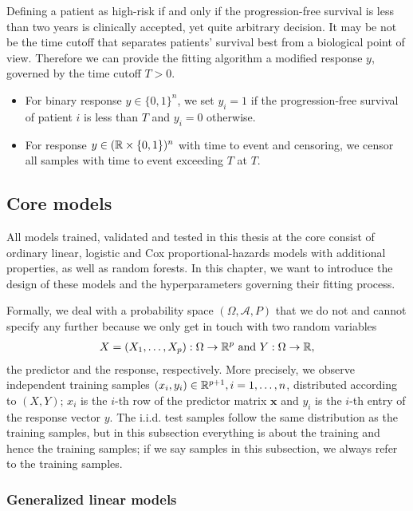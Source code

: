 Defining a patient as high-risk if and only if the progression-free survival is less than two years
is clinically accepted, yet quite arbitrary decision. It may be not be the time cutoff that 
separates patients' survival 
best from a biological point of view. Therefore we can provide the fitting 
algorithm a modified response $y$, governed by the time cutoff $T > 0$.
\begin{itemize}
    \item For binary response $y \in \{0, 1\}^n$, we set $y_i = 1$ if the progression-free survival 
        of patient $i$ is less than $T$ and $y_i = 0$ otherwise.
    \item For response $y \in (\mathbb{R} \times \{0, 1\})^n$ with time to event and censoring, we censor 
        all samples with time to event exceeding $T$ at $T$.
\end{itemize}

\subsection{Core models}\label{subsec:core-models}

All models trained, validated and tested in this thesis at the core consist of ordinary linear, 
logistic and Cox proportional-hazards models with additional properties, as well as random forests.
In this chapter, we want to introduce the design of these models and the hyperparameters governing 
their fitting process.

Formally, we deal with a probability space $(\Omega, \mathcal{A}, P)$ that we do not and cannot 
specify any further because we only get in touch with two random variables 
\begin{align}
    X = (X_1, \ldots, X_p): \Omega \to \mathbb{R}^p \text{ and } Y: \Omega \to \mathbb{R},
\end{align}
the predictor and the response, respectively. More 
precisely, we observe independent training samples $(x_i, y_i) \in \mathbb{R}^{p+1}, i = 1, \ldots, n$, 
distributed according to $(X, Y)$; $x_i$ is the $i$-th row of the predictor matrix $\mathbf{x}$ and
$y_i$ is the $i$-th entry of the response vector $y$. The i.i.d. test samples follow the same 
distribution as the training samples, but in this subsection everything is about the training and 
hence the training samples; if we say samples in this subsection, we always refer to the training   
samples.

\subsubsection{Generalized linear models}\label{subsubsec:glm}

